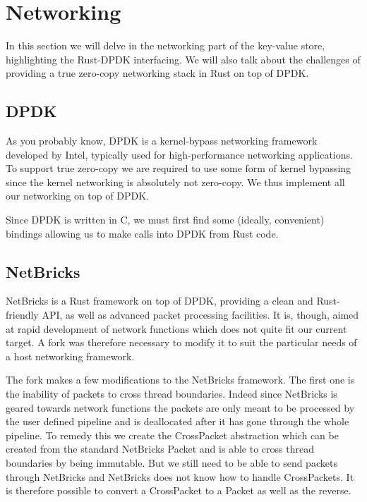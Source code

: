 \documentclass[11pt]{article}
\begin{document}
\section{Networking}

In this section we will delve in the networking part of the key-value
store, highlighting the Rust-DPDK interfacing. We will also talk about
the challenges of providing a true zero-copy networking stack in Rust
on top of DPDK.

\subsection{DPDK}

As you probably know, DPDK is a kernel-bypass networking framework
developed by Intel, typically used for high-performance networking
applications. To support true zero-copy we are required to use some
form of kernel bypassing since the kernel networking is absolutely
not zero-copy. We thus implement all our networking on top of DPDK.

Since DPDK is written in C, we must first find some (ideally,
convenient) bindings allowing us to make calls into DPDK from Rust
code.

\subsection{NetBricks}
NetBricks is a Rust framework on top of DPDK, providing a clean and
Rust-friendly API, as well as advanced packet processing facilities.
It is, though, aimed at rapid development of network functions which
does not quite fit our current target. A fork was therefore necessary
to modify it to suit the particular needs of a host networking
framework.

The fork makes a few modifications to the NetBricks framework. The
first one is the inability of packets to cross thread
boundaries. Indeed since NetBricks is geared towards network functions
the packets are only meant to be processed by the user defined
pipeline and is deallocated after it has gone through the whole
pipeline. To remedy this we create the CrossPacket abstraction which
can be created from the standard NetBricks Packet and is able to cross
thread boundaries by being immutable. But we still need to be able to
send packets through NetBricks and NetBricks does not know how to
handle CrossPackets. It is therefore possible to convert a CrossPacket
to a Packet as well as the reverse.
\end{document}
